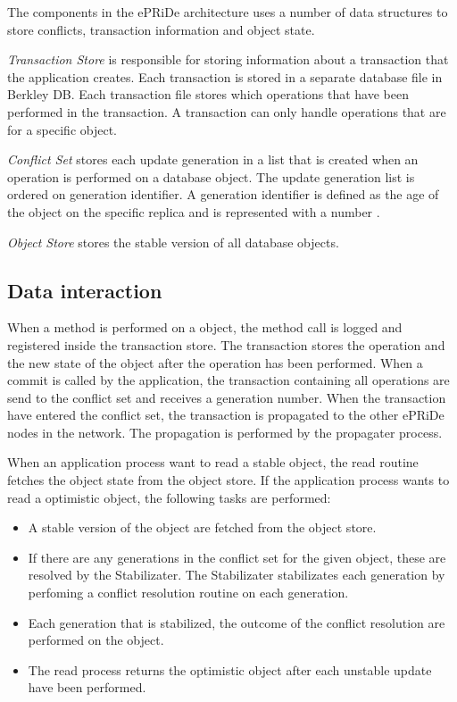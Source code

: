 The components in the ePRiDe architecture uses a number of data structures to store conflicts, transaction information and object state. 

\emph{Transaction Store} is responsible for storing information about a transaction that the application creates. Each transaction is stored in a separate database file in Berkley DB.  Each transaction file stores which operations that have been performed in the transaction. A transaction can only handle operations that are for a specific object.

\emph{Conflict Set} stores each update generation in a list that is created when an operation is performed on a database object. The update generation list is ordered on generation identifier. A generation identifier is defined as the age of the object on the specific replica and is represented with a number \cite[]{Syber2007}.    
 
\emph{Object Store} stores the stable version of all database objects. 


\subsection{Data interaction} %
\label{sub:data_interaction}

When a method is performed on a object, the method call is logged and registered inside the transaction store. The transaction stores the operation and the new state of the object after the operation has been performed. When a commit is called by the application, the transaction containing all operations are send to the conflict set and receives a generation number. When the transaction have entered the conflict set, the transaction is propagated to the other ePRiDe nodes in the network. The propagation is performed by the propagater process. 

When an application process want to read a stable object, the read routine fetches the object state from the object store. If the application process wants to read a optimistic object, the following tasks are performed: 
\begin{itemize}
	\item A stable version of the object are fetched from the object store.
	\item If there are any generations in the conflict set for the given object, these are resolved by the Stabilizater. The Stabilizater stabilizates each generation by perfoming a conflict resolution routine on each generation. 
	\item Each generation that is stabilized, the outcome of the conflict resolution are performed on the object. 
	\item The read process returns the optimistic object after each unstable update have been performed.
\end{itemize}


